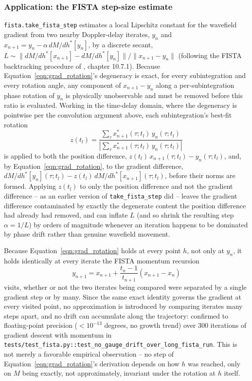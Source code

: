 \documentclass[manuscript]{aastex631}
\newcommand{\Eqn}[1]{Equation~\ref{eqn:#1}}
\begin{document}
\subsubsection*{Application: the FISTA step-size estimate}

\texttt{fista.take\_fista\_step} estimates a local Lipschitz constant for the wavefield gradient
from two nearby Doppler-delay iterates, $y_n$ and $x_{n+1} = y_n - \alpha\, dM/dh^*[y_n]$, by a
discrete secant, $L \sim \|dM/dh^*[x_{n+1}] - dM/dh^*[y_n]\| / \|x_{n+1}-y_n\|$ (following the
FISTA backtracking procedure of \citealt{beck17}, chapter 10.7.1). Because \Eqn{grad_rotation}'s
degeneracy is exact, for every subintegration and every rotation angle, any component of
$x_{n+1}-y_n$ along a per-subintegration phase rotation of $y_n$ is physically unobservable and
must be removed before this ratio is evaluated. Working in the time-delay domain, where the
degeneracy is pointwise per the convolution argument above, each subintegration's best-fit
rotation
\begin{equation}
z(t_l) = \frac{\sum_\tau x^*_{n+1}(\tau;t_l)\, y_n(\tau;t_l)}
              {\left|\sum_\tau x^*_{n+1}(\tau;t_l)\, y_n(\tau;t_l)\right|}
\end{equation}
is applied to both the position difference, $z(t_l)\,x_{n+1}(\tau;t_l) - y_n(\tau;t_l)$, and, by
\Eqn{grad_rotation}, to the gradient difference,
$dM/dh^*[y_n](\tau;t_l) - z(t_l)\, dM/dh^*[x_{n+1}](\tau;t_l)$, before their norms are formed.
Applying $z(t_l)$ to only the position difference and not the gradient difference -- as an earlier
version of \texttt{take\_fista\_step} did -- leaves the gradient difference contaminated by exactly
the degenerate content the position difference had already had removed, and can inflate $L$
(and so shrink the resulting step $\alpha=1/L$) by orders of magnitude whenever an iteration
happens to be dominated by phase drift rather than genuine wavefield movement.

Because \Eqn{grad_rotation} holds at every point $h$, not only at $y_n$, it holds identically at
every iterate the FISTA momentum recursion
\begin{equation}
y_{n+1} = x_{n+1} + \frac{t_n-1}{t_{n+1}}\left(x_{n+1}-x_n\right)
\end{equation}
visits, whether or not the two iterates being compared were separated by a single gradient step
or by many. Since the same exact identity governs the gradient at every visited point, no
approximation is introduced by comparing iterates many steps apart, and no drift can accumulate
along the trajectory: confirmed to floating-point precision ($<10^{-13}$ degrees, no growth trend)
over 300 iterations of gradient descent with momentum in
\texttt{tests/test\_fista.py::test\_no\_gauge\_drift\_over\_long\_fista\_run}. This is not merely
a favorable empirical observation -- no step of \Eqn{grad_rotation}'s derivation depends on how
$h$ was reached, only on $M$ being exactly, not approximately, invariant under the rotation at
$h$ itself.
\end{document}
